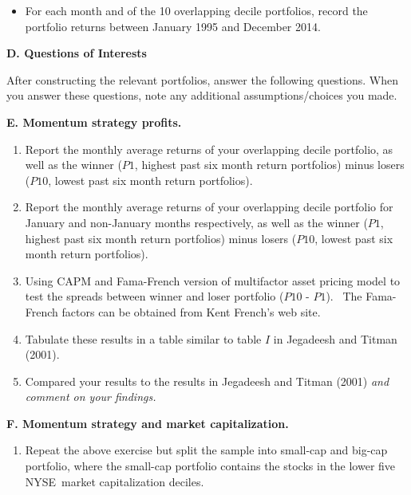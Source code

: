 \begin{enumerate}[1.]
\begin{itemize}
\item For each month and of the 10 overlapping decile portfolios, record the
portfolio returns between January 1995 and December 2014.
\end{itemize}
\hfill
\par\vspace{\baselineskip}
\textbf{D. Questions of Interests}
\hfill
\par\vspace{\baselineskip}
After constructing the relevant portfolios, answer the following questions.
When you answer these questions, note any additional assumptions/choices you
made.
\hfill
\par\vspace{\baselineskip}
\textbf{E. Momentum strategy profits.}
\hfill
\par\vspace{\baselineskip}
\begin{enumerate}
\item Report the monthly average returns of your overlapping decile
portfolio, as well as the winner ($P1$, highest past six month return
portfolios) minus losers ($P10$, lowest past six month return portfolios).

\item Report the monthly average returns of your overlapping decile
portfolio for January and non-January months respectively, as well as the
winner ($P1$, highest past six month return portfolios) minus losers ($P10$,
lowest past six month return portfolios).

\item Using CAPM and Fama-French version of multifactor asset pricing model
to test the spreads between winner and loser portfolio ($P10$ - $P1$). \ The
Fama-French factors can be obtained from Kent French's web site.

\item Tabulate these results in a table similar to table $I$ in Jegadeesh
and Titman (2001).

\item Compared your results to the results in Jegadeesh and Titman (2001)
\emph{and comment on your findings.}
\end{enumerate}
\hfill
\par\vspace{\baselineskip}
\textbf{F. Momentum strategy and market capitalization.}
\hfill
\par\vspace{\baselineskip}
\begin{enumerate}
\item Repeat the above exercise but split the sample into small-cap and
big-cap portfolio, where the small-cap portfolio contains the stocks in the
lower five NYSE\ market capitalization deciles.


\end{enumerate}
\end{enumerate}
